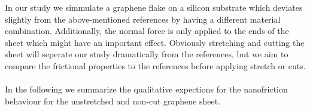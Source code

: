 












In our study we simmulate a graphene flake on a silicon substrate which deviates slightly from the above-mentioned references by having a different material combination. Additionally, the normal force is only applied to the ends of the sheet which might have an important effect. Obviously stretching and cutting the sheet will seperate our study dramatically from the references, but we aim to compare the frictional properties to the references before applying stretch or cuts. 
\\
\\
In the following we summarize the qualitative expections for the nanofriction behaviour for the unstretched and non-cut graphene sheet.
